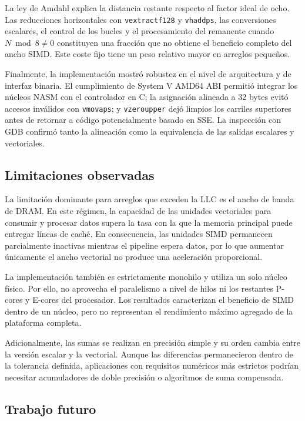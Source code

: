 \documentclass[journal]{IEEEtran}
\begin{document}
La ley de Amdahl explica la distancia restante respecto al factor ideal de
ocho. Las reducciones horizontales con \texttt{vextractf128} y
\texttt{vhaddps}, las conversiones escalares, el control de los bucles y el
procesamiento del remanente cuando $N\bmod8\neq0$ constituyen una fracción que
no obtiene el beneficio completo del ancho SIMD. Este coste fijo tiene un peso
relativo mayor en arreglos pequeños.

Finalmente, la implementación mostró robustez en el nivel de arquitectura y de
interfaz binaria. El cumplimiento de System V AMD64 ABI permitió integrar los
núcleos NASM con el controlador en C; la asignación alineada a 32 bytes evitó
accesos inválidos con \texttt{vmovaps}; y \texttt{vzeroupper} dejó limpios los
carriles superiores antes de retornar a código potencialmente basado en SSE.
La inspección con GDB confirmó tanto la alineación como la equivalencia de las
salidas escalares y vectoriales.

\subsection{Limitaciones observadas}

La limitación dominante para arreglos que exceden la LLC es el ancho de banda
de DRAM. En este régimen, la capacidad de las unidades vectoriales para consumir
y procesar datos supera la tasa con la que la memoria principal puede entregar
líneas de caché. En consecuencia, las unidades SIMD permanecen parcialmente
inactivas mientras el pipeline espera datos, por lo que aumentar únicamente el
ancho vectorial no produce una aceleración proporcional.

La implementación también es estrictamente monohilo y utiliza un solo núcleo
físico. Por ello, no aprovecha el paralelismo a nivel de hilos ni los restantes
P-cores y E-cores del procesador. Los resultados caracterizan el beneficio de
SIMD dentro de un núcleo, pero no representan el rendimiento máximo agregado de
la plataforma completa.

Adicionalmente, las sumas se realizan en precisión simple y su orden cambia
entre la versión escalar y la vectorial. Aunque las diferencias permanecieron
dentro de la tolerancia definida, aplicaciones con requisitos numéricos más
estrictos podrían necesitar acumuladores de doble precisión o algoritmos de
suma compensada.

\subsection{Trabajo futuro}
\end{document}

